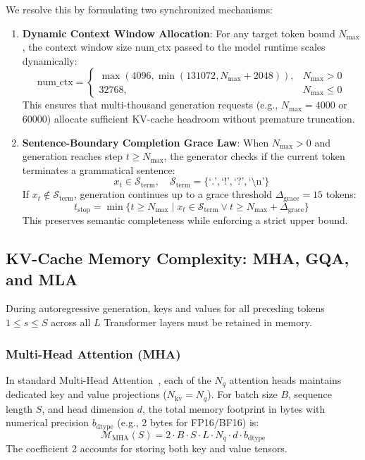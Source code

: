 \documentclass[10pt,twocolumn]{article}
\begin{document}
We resolve this by formulating two synchronized mechanisms:
\begin{enumerate}
    \item \textbf{Dynamic Context Window Allocation}:
    For any target token bound $N_{\text{max}}$, the context window size $\mathrm{num\_ctx}$ passed to the model runtime scales dynamically:
    \begin{equation}
    \mathrm{num\_ctx} = \begin{cases}
    \max(4096, \min(131072, N_{\text{max}} + 2048)), & N_{\text{max}} > 0 \\
    32768, & N_{\text{max}} \le 0
    \end{cases}
    \end{equation}
    This ensures that multi-thousand generation requests (e.g., $N_{\text{max}} = 4000$ or $60000$) allocate sufficient KV-cache headroom without premature truncation.
    \item \textbf{Sentence-Boundary Completion Grace Law}:
    When $N_{\text{max}} > 0$ and generation reaches step $t \ge N_{\text{max}}$, the generator checks if the current token terminates a grammatical sentence:
    \begin{equation}
    x_t \in \mathcal{S}_{\text{term}}, \quad \mathcal{S}_{\text{term}} = \{ \text{`.'}, \text{`!'}, \text{`?'}, \text{`\textbackslash n'} \}
    \end{equation}
    If $x_t \notin \mathcal{S}_{\text{term}}$, generation continues up to a grace threshold $\Delta_{\text{grace}} = 15$ tokens:
    \begin{equation}
    t_{\text{stop}} = \min \{ t \ge N_{\text{max}} \mid x_t \in \mathcal{S}_{\text{term}} \lor t \ge N_{\text{max}} + \Delta_{\text{grace}} \}
    \end{equation}
    This preserves semantic completeness while enforcing a strict upper bound.
\end{enumerate}

\subsection{KV-Cache Memory Complexity: MHA, GQA, and MLA}
During autoregressive generation, keys and values for all preceding tokens $1 \le s \le S$ across all $L$ Transformer layers must be retained in memory.

\subsubsection{Multi-Head Attention (MHA)}
In standard Multi-Head Attention~\cite{vaswani2017attention}, each of the $N_q$ attention heads maintains dedicated key and value projections ($N_{\text{kv}} = N_q$). For batch size $B$, sequence length $S$, and head dimension $d$, the total memory footprint in bytes with numerical precision $b_{\text{dtype}}$ (e.g., 2 bytes for FP16/BF16) is:
\begin{equation}
\mathcal{M}_{\text{MHA}}(S) = 2 \cdot B \cdot S \cdot L \cdot N_q \cdot d \cdot b_{\text{dtype}}
\end{equation}
The coefficient 2 accounts for storing both key and value tensors.
\end{document}
